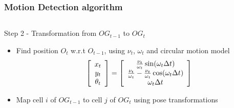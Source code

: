 \documentclass{beamer}
\begin{document}
	\begin{frame}
		\frametitle{Motion Detection algorithm}

		  \begin{columns}[t]
		  \begin{column}{5cm}
			\begin{block}{Step 2 - Transformation from $OG_{t-1}$ to $OG_{t}$ }
			\begin{itemize}
			\item Find position $O_t$ w.r.t $O_{t-1}$, using $\nu_t$, $\omega_t$ and circular motion model
			\begin{equation}
			\left[\begin{array}{c}x_t \\ y_t\\ \theta_t \end{array} \right] = 
			\left[\begin{array}{c} {\nu_t \over \omega_t} \sin(\omega_t \Delta t) \\ {\nu_t \over \omega_t} - {\nu_t \over \omega_t} \cos(\omega_t \Delta t) \\ \omega_t \Delta t \end{array}\right]
			\label{eq:circularmotion}
			\end{equation}
			\item Map cell $i$ of $OG_{t-1}$ to cell $j$ of $OG_{t}$ using pose transformations
			\end{itemize}		
			\end{block}			
			

\end{column}
\end{columns}
\end{frame}
\end{document}
